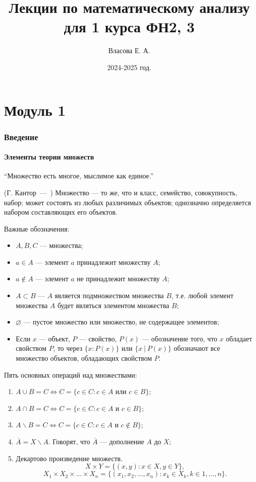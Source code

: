 \documentclass[a4paper,12pt]{article} %
\author{Власова Е. А.}
\title{Лекции по математическому анализу для 1 курса ФН2, 3}
\date{2024-2025 год.}
\let\oldquote\quote
\let\endoldquote\endquote
\renewenvironment{quote}[2][]
  {\if\relax\detokenize{#1}\relax
     \def\quoteauthor{#2}%
   \else
     \def\quoteauthor{#2~---~#1}%
   \fi
   \oldquote}
  {\par\nobreak\smallskip\hfill(\quoteauthor)%
   \endoldquote\addvspace{\bigskipamount}}
\theoremstyle{remark}
\theoremstyle{definition}
\begin{document}

\maketitle

\newpage
\tableofcontents
\newpage

\part*{Модуль 1}

\section{Введение}
\subsection{Элементы теории множеств}
\begin{quote}{Г. Кантор}
	``Множество есть многое, мыслимое как единое.''
\end{quote}
Множество --- то же, что и класс, семейство, совокупность, набор; может состоять из любых различимых объектов; однозначно определяется набором составляющих его объектов.

Важные обозначения:
\begin{itemize}
	\item $A, B, C$ --- множества;
	\item $a\in A$ --- элемент $a$ принадлежит множеству $A$;
	\item $a \not\in A$ --- элемент $a$ не принадлежит множеству $A$;
	\item $A\subset B$ --- $A$ является подмножеством множества $B$, т.е. любой элемент множества $A$ будет являться элементом множества $B$;
	\item $\varnothing$ --- пустое множество или множество, не содержащее элементов;
	\item Если $x$ --- объект, $P$ --- свойство, $P(x)$ --- обозначение того, что $x$ обладает свойством $P$, то через $\{x : P(x)\}$ или $\{x \ | \ P(x)\} $ обозначают все множество объектов, обладающих свойством $P$.
\end{itemize}

Пять основных операций над множествами:
\begin{enumerate}
	\item $A \cup B = C \iff C = \{c \in C : c \in A \text{ или } c\in B\}$;
	\item $A \cap B = C \iff C = \{c \in C : c\in A \text{ и } c\in B\}$;
	\item $A\backslash B = C \iff C = \{c\in C : c\in A \text{ и } c \not\in B\}$;
	\item $\overline{A} = X\backslash A$. Говорят, что $\overline{A}$ --- дополнение $A$ до $X$;
	\item Декартово произведение множеств.
		\[
		X \times Y = \{(x, y) : x \in X, y \in Y\} 
		,\] 
		\[
			X_1 \times X_2 \times \ldots \times X_n = \{(x_1, x_2, \ldots, x_{n}) : x_k \in X_k, k \in 1, \ldots, n \}
		.\] 
\end{enumerate}
\end{document}
